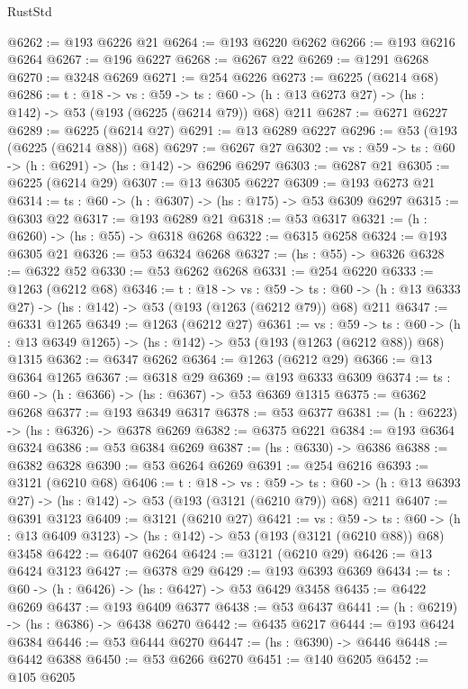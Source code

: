 \begin{lexlean}{RustStd}
\begin{coremodule}
@6262 := @193 @6226 @21
@6264 := @193 @6220 @6262
@6266 := @193 @6216 @6264
@6267 := @196 @6227
@6268 := @6267 @22
@6269 := @1291 @6268
@6270 := @3248 @6269
@6271 := @254 @6226
@6273 := @6225 (@6214 @68)
@6286 := {t : @18} ->
  {vs : @59} ->
  {ts : @60} -> (h : @13 @6273 @27) -> (hs : @142) -> @53 (@193 (@6225 (@6214 @79)) @68) @211
@6287 := @6271 @6227
@6289 := @6225 (@6214 @27)
@6291 := @13 @6289 @6227
@6296 := @53 (@193 (@6225 (@6214 @88)) @68)
@6297 := @6267 @27
@6302 := {vs : @59} -> {ts : @60} -> (h : @6291) -> (hs : @142) -> @6296 @6297
@6303 := @6287 @21
@6305 := @6225 (@6214 @29)
@6307 := @13 @6305 @6227
@6309 := @193 @6273 @21
@6314 := {ts : @60} -> (h : @6307) -> (hs : @175) -> @53 @6309 @6297
@6315 := @6303 @22
@6317 := @193 @6289 @21
@6318 := @53 @6317
@6321 := (h : @6260) -> (hs : @55) -> @6318 @6268
@6322 := @6315 @6258
@6324 := @193 @6305 @21
@6326 := @53 @6324 @6268
@6327 := (hs : @55) -> @6326
@6328 := @6322 @52
@6330 := @53 @6262 @6268
@6331 := @254 @6220
@6333 := @1263 (@6212 @68)
@6346 := {t : @18} ->
  {vs : @59} ->
  {ts : @60} -> (h : @13 @6333 @27) -> (hs : @142) -> @53 (@193 (@1263 (@6212 @79)) @68) @211
@6347 := @6331 @1265
@6349 := @1263 (@6212 @27)
@6361 := {vs : @59} ->
  {ts : @60} -> (h : @13 @6349 @1265) -> (hs : @142) -> @53 (@193 (@1263 (@6212 @88)) @68) @1315
@6362 := @6347 @6262
@6364 := @1263 (@6212 @29)
@6366 := @13 @6364 @1265
@6367 := @6318 @29
@6369 := @193 @6333 @6309
@6374 := {ts : @60} -> (h : @6366) -> (hs : @6367) -> @53 @6369 @1315
@6375 := @6362 @6268
@6377 := @193 @6349 @6317
@6378 := @53 @6377
@6381 := (h : @6223) -> (hs : @6326) -> @6378 @6269
@6382 := @6375 @6221
@6384 := @193 @6364 @6324
@6386 := @53 @6384 @6269
@6387 := (hs : @6330) -> @6386
@6388 := @6382 @6328
@6390 := @53 @6264 @6269
@6391 := @254 @6216
@6393 := @3121 (@6210 @68)
@6406 := {t : @18} ->
  {vs : @59} ->
  {ts : @60} -> (h : @13 @6393 @27) -> (hs : @142) -> @53 (@193 (@3121 (@6210 @79)) @68) @211
@6407 := @6391 @3123
@6409 := @3121 (@6210 @27)
@6421 := {vs : @59} ->
  {ts : @60} -> (h : @13 @6409 @3123) -> (hs : @142) -> @53 (@193 (@3121 (@6210 @88)) @68) @3458
@6422 := @6407 @6264
@6424 := @3121 (@6210 @29)
@6426 := @13 @6424 @3123
@6427 := @6378 @29
@6429 := @193 @6393 @6369
@6434 := {ts : @60} -> (h : @6426) -> (hs : @6427) -> @53 @6429 @3458
@6435 := @6422 @6269
@6437 := @193 @6409 @6377
@6438 := @53 @6437
@6441 := (h : @6219) -> (hs : @6386) -> @6438 @6270
@6442 := @6435 @6217
@6444 := @193 @6424 @6384
@6446 := @53 @6444 @6270
@6447 := (hs : @6390) -> @6446
@6448 := @6442 @6388
@6450 := @53 @6266 @6270
@6451 := @140 @6205
@6452 := @105 @6205

\end{coremodule}
\end{lexlean}
